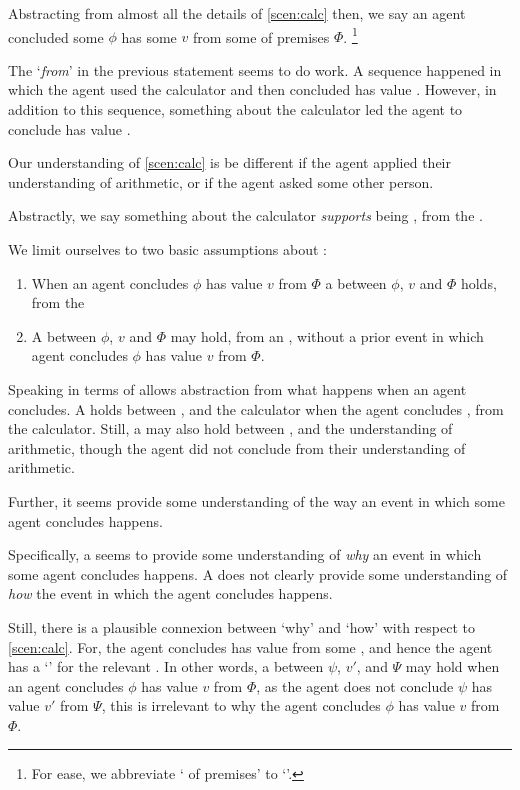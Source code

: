 \begin{note}
  Abstracting from almost all the details of \autoref{scen:calc} then, we say an agent concluded some \prop{} \(\phi\) has some \val{} \(v\) from some \pool{} of premises \(\Phi\).%
  \footnote{
    For ease, we abbreviate `\pool{} of premises' to `\pool{}'.
  }

  The `\emph{from}' in the previous statement seems to do work.
  A sequence happened in which the agent used the calculator and then concluded \propM{\gistCalcEq{}} has value .
  However, in addition to this sequence, something about the calculator led the agent to conclude \propM{\gistCalcEq{}} has value .

  Our understanding of \autoref{scen:calc} is be different if the agent applied their understanding of arithmetic, or if the agent asked some other person.

  Abstractly, we say something about the calculator \emph{supports} \propM{\gistCalcEq{}} being , from the \agpe{}.

  We limit ourselves to two basic assumptions about :
  \begin{enumerate}
  \item
    When an agent concludes \(\phi\) has value \(v\) from \(\Phi\) a \ros{} between \(\phi\), \(v\) and \(\Phi\) holds, from the \agpe{}
  \item
    A \ros{} between \(\phi\), \(v\) and \(\Phi\) may hold, from an \agpe{}, without a prior event in which agent concludes \(\phi\) has value \(v\) from \(\Phi\).
  \end{enumerate}
  Speaking in terms of  allows abstraction from what happens when an agent concludes.
  A \ros{} holds between \propM{\gistCalcEq{}},  and the calculator when the agent concludes \propM{\gistCalcEq{}},  from the calculator.
  Still, a \ros{} may also hold between \propM{\gistCalcEq{}},  and the \agents{} understanding of arithmetic, though the agent did not conclude from their understanding of arithmetic.

  Further, it seems  provide some understanding of the way an event in which some agent concludes happens.

  Specifically, a \ros{} seems to provide some understanding of \emph{why} an event in which some agent concludes happens.
  A \ros{} does not clearly provide some understanding of \emph{how} the event in which the agent concludes happens.

  Still, there is a plausible connexion between `why' and `how' with respect to \autoref{scen:calc}.
  For, the agent concludes \propM{\gistCalcEq{}} has value  from some \pool{}, and hence the agent has a `\wit{}' for the relevant \ros{}.
  In other words, a \ros{} between \(\psi\), \(v'\), and \(\Psi\) may hold when an agent concludes \(\phi\) has value \(v\) from \(\Phi\), as the agent does not conclude \(\psi\) has value \(v'\) from \(\Psi\), this \ros{} is irrelevant to why the agent concludes \(\phi\) has value \(v\) from \(\Phi\).
\end{note}

